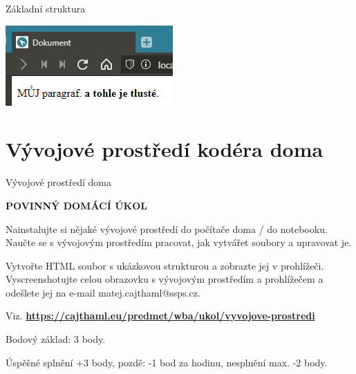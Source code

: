 \documentclass[aspectratio=1610]{beamer}
\begin{document}
\begin{frame}{Základní struktura}
    \begin{center}
        \includegraphics[width=\textwidth]{img/html-6-render.png}
    \end{center}
\end{frame}



\section{Vývojové prostředí kodéra doma}

\begin{frame}{Vývojové prostředí doma}
    \begin{cardTiny}
        \begin{center}
            \textbf{POVINNÝ DOMÁCÍ ÚKOL}
        \end{center}
        \begin{flushleft}
            Nainstalujte si nějaké vývojové prostředí do počítače doma / do notebooku. Naučte se s vývojovým prostředím pracovat, jak vytvářet soubory a upravovat je.

            \vspace{2ex}
            Vytvořte HTML soubor s ukázkovou strukturou a zobrazte jej v prohlížeči. Vyscreenshotujte celou obrazovku s vývojovým prostředím a prohlížečem a odešlete jej na e-mail matej.cajthaml@ssps.cz. 
            
            \vspace{2ex}
            Viz. \textbf{\href{https://cajthaml.eu/predmet/wba/ukol/vyvojove-prostredi}{https://cajthaml.eu/predmet/wba/ukol/vyvojove-prostredi}}

            Bodový základ: 3 body.

            Úspěšné splnění +3 body, pozdě: -1 bod za hodinu, nesplnění max. -2 body. 
        \end{flushleft}
    \end{cardTiny}
\end{frame}
\end{document}
